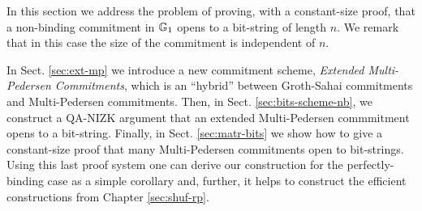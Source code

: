 In this section we address the problem of proving, with a constant-size proof,  that a non-binding commitment in $\mathbb{G}_1$ opens to a bit-string of length $n$. We remark that in this case the size of the commitment is independent of $n$. 

In Sect. \ref{sec:ext-mp} we introduce a new commitment scheme, \emph{Extended Multi-Pedersen Commitments}, which is an ``hybrid'' between Groth-Sahai commitments and Multi-Pedersen commitments.
Then, in Sect. \ref{sec:bits-scheme-nb}, we construct a QA-NIZK argument that an extended Multi-Pedersen commmitment opens to a bit-string. Finally, in Sect. \ref{sec:matr-bits} we show how to give a constant-size proof that many Multi-Pedersen commitments open to bit-strings. Using this last proof system one can derive our construction for the perfectly-binding case as a simple corollary and, further, it helps to construct the efficient constructions from Chapter \ref{sec:shuf-rp}.
